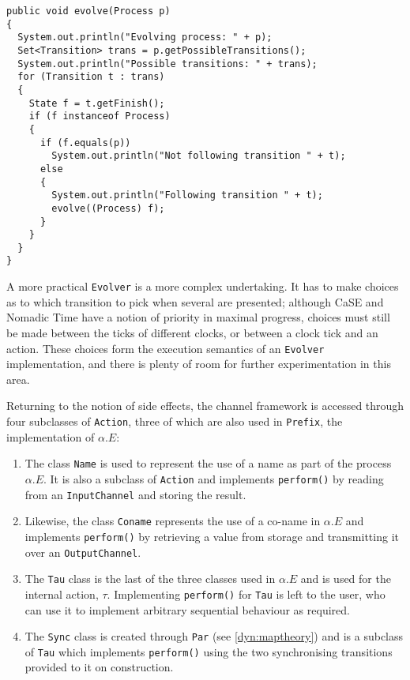 \begin{verbatim}
public void evolve(Process p)
{
  System.out.println("Evolving process: " + p);
  Set<Transition> trans = p.getPossibleTransitions();
  System.out.println("Possible transitions: " + trans);
  for (Transition t : trans)
  {
    State f = t.getFinish();
    if (f instanceof Process)
    {
      if (f.equals(p))
        System.out.println("Not following transition " + t);
      else
      {
        System.out.println("Following transition " + t);
        evolve((Process) f);
      }
    }
  }
}
\end{verbatim}

A more practical \texttt{Evolver} is a more complex undertaking.  It
has to make choices as to which transition to pick when several are
presented; although CaSE and Nomadic Time have a notion of priority in
maximal progress, choices must still be made between the ticks of
different clocks, or between a clock tick and an action.  These
choices form the execution semantics of an \texttt{Evolver}
implementation, and there is plenty of room for further
experimentation in this area.

Returning to the notion of side effects, the channel framework is
accessed through four subclasses of \texttt{Action}, three of which
are also used in \texttt{Prefix}, the implementation of $\alpha.E$:

\begin{enumerate}
\item The class \texttt{Name} is used to represent the use of a name
  as part of the process $\alpha.E$.  It is also a subclass of
  \texttt{Action} and implements \texttt{perform()} by reading from an
  \texttt{InputChannel} and storing the result.
\item Likewise, the class \texttt{Coname} represents the use of a
  co-name in $\alpha.E$ and implements \texttt{perform()} by
  retrieving a value from storage and transmitting it over an
  \texttt{OutputChannel}.
\item The \texttt{Tau} class is the last of the three classes used in
  $\alpha.E$ and is used for the internal action, $\tau$.
  Implementing \texttt{perform()} for \texttt{Tau} is left to the
  user, who can use it to implement arbitrary sequential behaviour as
  required.
\item The \texttt{Sync} class is created through \texttt{Par} (see
  \ref{dyn:maptheory}) and is a subclass of \texttt{Tau} which
  implements \texttt{perform()} using the two synchronising
  transitions provided to it on construction.
\end{enumerate}

